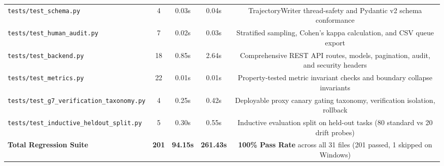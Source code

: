 \begin{table}[t]
\begin{tabular}{lcccc}
\texttt{tests/test\_schema.py} & 4 & 0.03s & 0.04s & TrajectoryWriter thread-safety and Pydantic v2 schema conformance \\
\texttt{tests/test\_human\_audit.py} & 7 & 0.02s & 0.03s & Stratified sampling, Cohen's kappa calculation, and CSV queue export \\
\texttt{tests/test\_backend.py} & 18 & 0.85s & 2.64s & Comprehensive REST API routes, models, pagination, audit, and security headers \\
\texttt{tests/test\_metrics.py} & 22 & 0.01s & 0.01s & Property-tested metric invariant checks and boundary collapse invariants \\
\texttt{tests/test\_g7\_verification\_taxonomy.py} & 4 & 0.25s & 0.42s & Deployable proxy canary gating taxonomy, verification isolation, rollback \\
\texttt{tests/test\_inductive\_heldout\_split.py} & 5 & 0.30s & 0.55s & Inductive evaluation split on held-out tasks (80 standard vs 20 drift probes) \\
\midrule
\textbf{Total Regression Suite} & \textbf{201} & \textbf{94.15s} & \textbf{261.43s} & \textbf{100\% Pass Rate} across all 31 files (201 passed, 1 skipped on Windows) \\
\bottomrule
\end{tabular}
\end{table}

